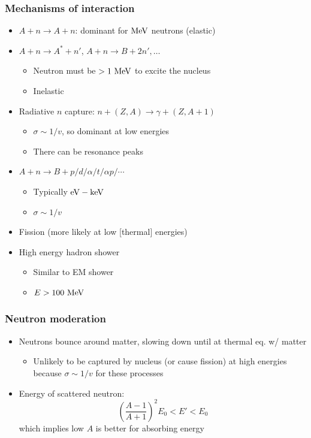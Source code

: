 \subsubsection{Mechanisms of interaction}
\begin{itemize}
  \item $A+n\rightarrow A+n$: dominant for $\text{MeV}$ neutrons (elastic)
  \item $A+n\rightarrow A^*+n'$, $A+n\rightarrow B+2n',\dots$
  \begin{itemize}
    \item Neutron must be $> 1~\text{MeV}$ to excite the nucleus
    \item Inelastic
  \end{itemize}
  \item Radiative $n$ capture: $n+(Z,A)\rightarrow \gamma+(Z,A+1)$
  \begin{itemize}
    \item $\sigma \sim 1/v$, so dominant at low energies
    \item There can be resonance peaks
  \end{itemize}
  \item $A+n\rightarrow B + p/d/\alpha/t/\alpha p/\cdots$
  \begin{itemize}
    \item Typically $\text{eV}-\text{keV}$
    \item $\sigma\sim 1/v$
  \end{itemize}
  \item Fission (more likely at low [thermal] energies)
  \item High energy hadron shower
  \begin{itemize}
    \item Similar to EM shower
    \item $E > 100~\text{MeV}$
  \end{itemize}
\end{itemize}
\subsubsection{Neutron moderation}
\begin{itemize}
  \item Neutrons bounce around matter, slowing down until at thermal eq. w/ matter
  \begin{itemize}
    \item Unlikely to be captured by nucleus (or cause fission) at high energies because $\sigma\sim 1/v$ for these processes
  \end{itemize}
  \item Energy of scattered neutron:
  \begin{equation}
    \left(\frac{A-1}{A+1}\right)^2 E_0 < E' <E_0
  \end{equation}
  which implies low $A$ is better for absorbing energy
\end{itemize}

